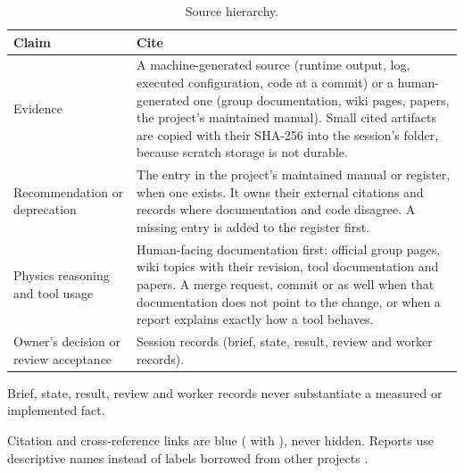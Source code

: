 \begin{table}[H]
  \small
  \begin{tabularx}{\textwidth}{L{0.27\textwidth}Y}
    \toprule
    Claim & Cite \\
    \midrule
    Evidence & A machine-generated source (runtime output, log, executed configuration,
    code  at a commit) or a human-generated one (group documentation, wiki
    pages, papers, the project's maintained manual). Small cited artifacts are copied with
    their SHA-256 into the session's  folder, because scratch storage is
    not durable. \\
    Recommendation or deprecation & The entry in the project's maintained manual or register,
    when one exists. It owns their external citations and records where documentation and
    code disagree. A missing entry is added to the register first. \\
    Physics reasoning and tool usage & Human-facing documentation first: official group
    pages, wiki topics with their revision, tool documentation and papers. A merge request,
    commit or  as well when that documentation does not point to the change,
    or when a report explains exactly how a tool behaves. \\
    Owner's decision or review acceptance & Session records (brief, state, result, review
    and worker records). \\
    \bottomrule
  \end{tabularx}
  \caption{Source hierarchy.}
  \label{tab:reports-hierarchy}
\end{table}

\begin{rulebox}
  Brief, state, result, review and worker records never substantiate a measured or
  implemented fact.
\end{rulebox}

Citation and cross-reference links are blue ( with ),
never hidden. Reports use descriptive names instead of labels borrowed from other
projects \cite[Source traceability and corroboration; Source hierarchy; Bibliography and
  reader-verifiable pinpoints; Writing character]{skill:report-production}.


